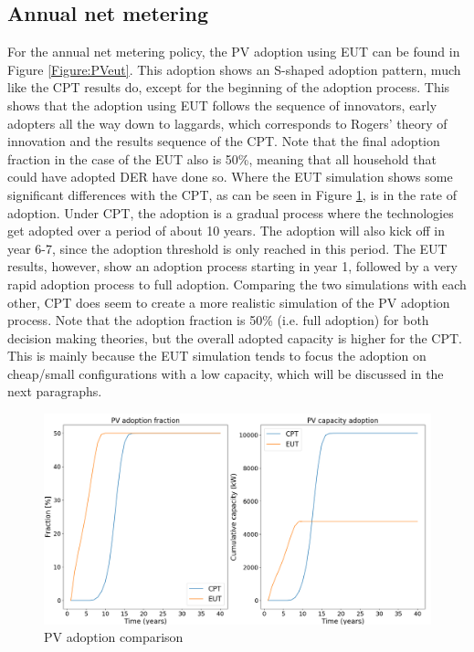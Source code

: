 \subsection{Annual net metering}
For the annual net metering policy, the PV adoption using EUT can be found in Figure \ref{Figure:PVeut}. This adoption shows an S-shaped adoption pattern, much like the CPT results do, except for the beginning of the adoption process. This shows that the adoption using EUT follows the sequence of innovators, early adopters all the way down to laggards, which corresponds to Rogers' theory of innovation and the results sequence of the CPT. Note that the final adoption fraction in the case of the EUT also is 50\%, meaning that all household that could have adopted DER have done so. Where the EUT simulation shows some significant differences with the CPT, as can be seen in Figure \ref{Figure:PVcompar}, is in the rate of adoption. 
 Under CPT, the adoption is a gradual process where the technologies get adopted over a period of about 10 years. The adoption will also kick off in year 6-7, since the adoption threshold is only reached in this period. The EUT results, however, show an adoption process starting in year 1, followed by a very rapid adoption process to full adoption. Comparing the two simulations with each other, CPT does seem to create a more realistic simulation of the PV adoption process. Note that the adoption fraction is 50\% (i.e. full adoption) for both decision making theories, but the overall adopted capacity is higher for the CPT. This is mainly because the EUT simulation tends to focus the adoption on cheap/small configurations with a low capacity, which will be discussed in the next paragraphs.
\begin{figure}[h!]
\centering
\includegraphics[width=12cm]{EUTCompar/PV.png}
\caption{PV adoption comparison}
\label{Figure:PVcompar}
\end{figure}
